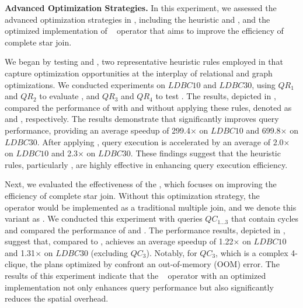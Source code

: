 \noindent\textbf{Advanced Optimization Strategies.}
In this experiment, we assessed the advanced optimization strategies in \name, including the heuristic \filterrule and \joinfuserule, and the optimized implementation of \expandintersect~ operator that aims to improve the efficiency of complete star join.

We began by testing \filterrule and \joinfuserule, two representative heuristic rules employed in \name that capture optimization opportunities at the interplay of relational and graph optimizations. We conducted experiments on $LDBC10$ and $LDBC30$, using $QR_1$ and $QR_2$ to evaluate \filterrule, and $QR_3$ and $QR_4$ to test \joinfuserule. The results, depicted in , compared the performance of \name with and without applying these rules, denoted as \name and \relgonofi, respectively.
The results demonstrate that \filterrule significantly improves query performance, providing an average speedup of 299.4$\times$ on $LDBC10$ and 699.8$\times$ on $LDBC30$. After applying \joinfuserule, query execution is accelerated by an average of 2.0$\times$ on $LDBC10$ and 2.3$\times$ on $LDBC30$. These findings suggest that the heuristic rules, particularly \filterrule, are highly effective in enhancing query execution efficiency.


Next, we evaluated the effectiveness of the \expandintersect, which focuses on improving the efficiency of complete star join. Without this optimization strategy, the \expandintersect~ operator would be implemented as a traditional multiple join, and we denote this variant as \relgomj. We conducted this experiment with queries $QC_{1 \ldots 3}$ that contain cycles and compared the performance of \name and \relgomj.
The performance results, depicted in , suggest that, compared to \relgomj, \name achieves an average speedup of 1.22$\times$ on $LDBC10$ and 1.31$\times$ on $LDBC30$ (excluding $QC_3$). Notably, for $QC_3$, which is a complex 4-clique, the plans optimized by \relgomj confront an out-of-memory (OOM) error. %
The results of this experiment indicate that the \expandintersect~ operator with an optimized implementation not only enhances query performance but also significantly reduces the spatial overhead.

